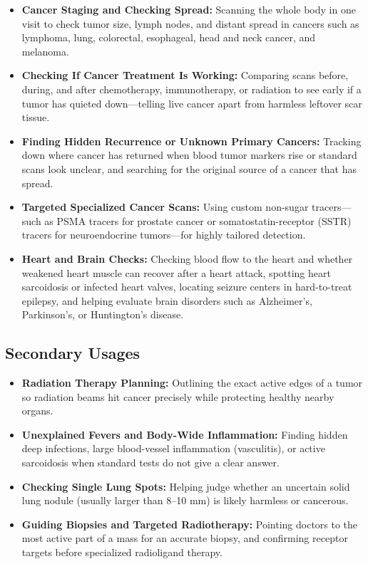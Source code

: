 \begin{itemize}
    \item \textbf{Cancer Staging and Checking Spread:} Scanning the whole body in one visit to check tumor size, lymph nodes, and distant spread in cancers such as lymphoma, lung, colorectal, esophageal, head and neck cancer, and melanoma.
    \item \textbf{Checking If Cancer Treatment Is Working:} Comparing scans before, during, and after chemotherapy, immunotherapy, or radiation to see early if a tumor has quieted down---telling live cancer apart from harmless leftover scar tissue.
    \item \textbf{Finding Hidden Recurrence or Unknown Primary Cancers:} Tracking down where cancer has returned when blood tumor markers rise or standard scans look unclear, and searching for the original source of a cancer that has spread.
    \item \textbf{Targeted Specialized Cancer Scans:} Using custom non-sugar tracers---such as PSMA tracers for prostate cancer or somatostatin-receptor (SSTR) tracers for neuroendocrine tumors---for highly tailored detection.
    \item \textbf{Heart and Brain Checks:} Checking blood flow to the heart and whether weakened heart muscle can recover after a heart attack, spotting heart sarcoidosis or infected heart valves, locating seizure centers in hard-to-treat epilepsy, and helping evaluate brain disorders such as Alzheimer's, Parkinson's, or Huntington's disease.
\end{itemize}

\subsection{Secondary Usages}

\begin{itemize}
    \item \textbf{Radiation Therapy Planning:} Outlining the exact active edges of a tumor so radiation beams hit cancer precisely while protecting healthy nearby organs.
    \item \textbf{Unexplained Fevers and Body-Wide Inflammation:} Finding hidden deep infections, large blood-vessel inflammation (vasculitis), or active sarcoidosis when standard tests do not give a clear answer.
    \item \textbf{Checking Single Lung Spots:} Helping judge whether an uncertain solid lung nodule (usually larger than 8--10 mm) is likely harmless or cancerous.
    \item \textbf{Guiding Biopsies and Targeted Radiotherapy:} Pointing doctors to the most active part of a mass for an accurate biopsy, and confirming receptor targets before specialized radioligand therapy.
\end{itemize}

